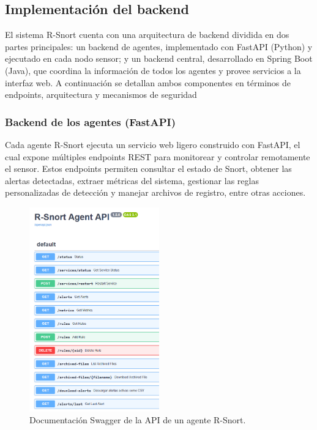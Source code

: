 \documentclass[11pt,a4paper,twoside]{report}
\begin{document}
\newpage

\subsection{Implementación del backend}

El sistema R-Snort cuenta con una arquitectura de backend dividida en dos partes principales: un backend de agentes, implementado con FastAPI (Python) y ejecutado en cada nodo sensor; y un backend central, desarrollado en Spring Boot (Java), que coordina la información de todos los agentes y provee servicios a la interfaz web. A continuación se detallan ambos componentes en términos de endpoints, arquitectura y mecanismos de seguridad

\subsubsection{Backend de los agentes (FastAPI)}

Cada agente R-Snort ejecuta un servicio web ligero construido con FastAPI, el cual expone múltiples endpoints REST para monitorear y controlar remotamente el sensor. Estos endpoints permiten consultar el estado de Snort, obtener las alertas detectadas, extraer métricas del sistema, gestionar las reglas personalizadas de detección y manejar archivos de registro, entre otras acciones.


\begin{figure}[htb]
	\centering
	\includegraphics[width=0.5\textwidth]{documento/13.png}
	\caption{Documentación Swagger de la API de un agente R-Snort.}
	\label{fig:fastapi}
\end{figure}
\end{document}
